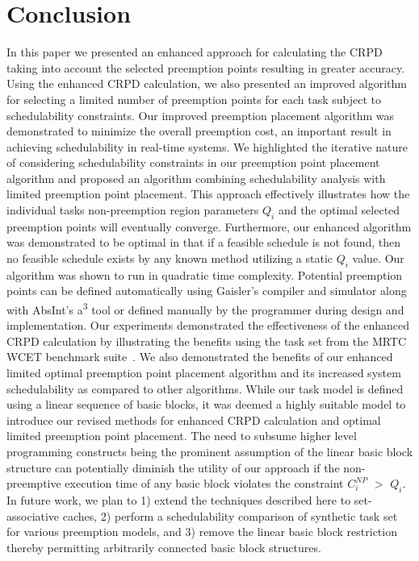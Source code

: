 \section{Conclusion}\label{sec:conclusion}

In this paper we presented an enhanced approach for calculating the
CRPD taking into account the selected preemption points resulting
in greater accuracy.  Using the enhanced CRPD calculation, we also
presented an improved algorithm for selecting a limited number of
preemption points for each task subject to schedulability constraints.
Our improved preemption placement algorithm was demonstrated to
minimize the overall preemption cost, an important result in achieving
schedulability in real-time systems.  We highlighted the iterative nature
of considering schedulability constraints in our preemption point
placement algorithm and proposed an algorithm combining schedulability
analysis with limited preemption point placement.  This approach
effectively illustrates how the individual tasks non-preemption
region parameters $Q_i$ and the optimal selected preemption points will
eventually converge.  Furthermore, our enhanced algorithm was demonstrated to be
optimal in that if a feasible schedule is not found, then no feasible
schedule exists by any known method utilizing a static $Q_i$ value.  Our algorithm
was shown to run in quadratic time complexity.  Potential preemption points can be
defined automatically using Gaisler's compiler and simulator along with AbsInt's
a\textsuperscript{3} tool or defined manually by the programmer during design
and implementation. Our experiments demonstrated the effectiveness of
the enhanced CRPD calculation by illustrating the benefits using the
task set from the MRTC WCET benchmark suite~\cite{mrtc:01}.
We also demonstrated the benefits of our enhanced limited optimal preemption
point placement algorithm and its increased system schedulability as
compared to other algorithms.  While our task model is defined using a linear
sequence of basic blocks, it was deemed a highly suitable model to introduce
our revised methods for enhanced CRPD calculation and optimal limited
preemption point placement.  The need to subsume higher level programming constructs
being the prominent assumption of the linear basic block structure can potentially
diminish the utility of our approach if the non-preemptive execution time of any basic block
violates the constraint \begin{math}C_{i}^{NP}\end{math} \begin{math}>\end{math} \begin{math}Q_{i}\end{math}.
In future work, we plan to 1) extend the techniques described here to set-associative caches,
2) perform a schedulability comparison of synthetic task set for various preemption models, and
3) remove the linear basic block restriction thereby permitting arbitrarily connected basic
block structures.
